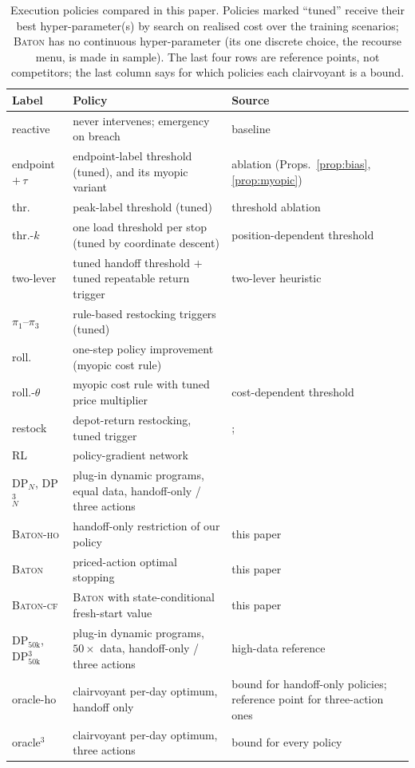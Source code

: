 \documentclass[preprint,authoryear,12pt]{elsarticle}
\theoremstyle{definition}
\theoremstyle{remark}
\begin{document}
\begin{table}[tp]
\caption{Execution policies compared in this paper. Policies marked
``tuned'' receive their best hyper-parameter(s) by search on realised
cost over the training scenarios; \textsc{Baton} has no continuous
hyper-parameter (its one discrete choice, the recourse menu, is made in
sample). The last four rows are reference points, not competitors; the last column says for which policies each clairvoyant is a bound.}
\label{tab:competitors}
\centering
\small
\setlength{\tabcolsep}{4pt}
\begin{tabular}{l p{5.3cm} p{4.4cm}}
\toprule
Label & Policy & Source \\
\midrule
reactive & never intervenes; emergency on breach & baseline \\
endpoint $+\,\tau$ & endpoint-label threshold (tuned), and its
  myopic variant & ablation (Props.~\ref{prop:bias}, \ref{prop:myopic}) \\
thr. & peak-label threshold (tuned) & threshold ablation \\
thr.-$k$ & one load threshold per stop (tuned by coordinate descent) &
  position-dependent threshold \\
two-lever & tuned handoff threshold $+$ tuned repeatable return trigger &
  two-lever heuristic \\
$\pi_1$--$\pi_3$ & rule-based restocking triggers (tuned) &
  \citet{salavati2019rule} \\
roll. & one-step policy improvement (myopic cost rule) &
  \citet{secomandi2001rollout} \\
roll.-$\theta$ & myopic cost rule with tuned price multiplier &
  cost-dependent threshold \\
restock & depot-return restocking, tuned trigger &
  \citet{yang2000stochastic}; \citet{florio2020new} \\
RL & policy-gradient network &
  \citet{iklassov2024rl} \\
DP$_N$, DP$^3_N$ & plug-in dynamic programs, equal data, handoff-only /
  three actions & \citet{secomandi2009reoptimization} \\
\textsc{Baton-ho} & handoff-only restriction of our policy & this paper \\
\textsc{Baton} & priced-action optimal stopping & this paper \\
\textsc{Baton-cf} & \textsc{Baton} with state-conditional fresh-start
  value & this paper \\
\midrule
DP$_{50\mathrm{k}}$, DP$^3_{50\mathrm{k}}$ & plug-in dynamic programs,
  $50{\times}$ data, handoff-only / three actions & high-data reference \\
oracle-ho & clairvoyant per-day optimum, handoff only & bound for
  handoff-only policies; reference point for three-action ones \\
oracle$^3$ & clairvoyant per-day optimum, three actions & bound for
  every policy \\
\bottomrule
\end{tabular}
\end{table}
\end{document}
